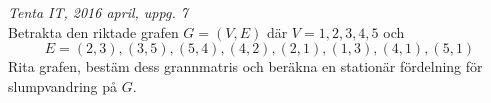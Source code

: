 {\it Tenta IT, 2016 april, uppg. 7}\\
Betrakta den riktade grafen $G=(V,E)$ där $V={1,2,3,4,5}$ och
$$E={(2,3),(3,5),(5,4),(4,2),(2,1),(1,3),(4,1),(5,1)}$$
Rita grafen, bestäm dess grannmatris och beräkna en stationär fördelning för slumpvandring på $G$.